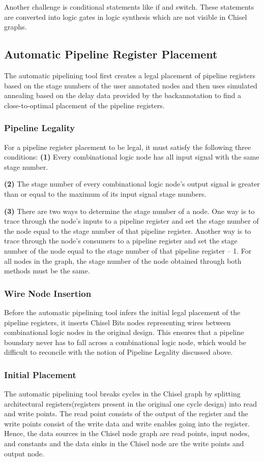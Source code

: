 Another challenge is conditional statements like if and switch. These statements are converted into logic gates in logic synthesis which are not visible in Chisel graphs. 

\subsection{Automatic Pipeline Register Placement}
The automatic pipelining tool first creates a legal placement of pipeline registers based on the stage numbers of the user annotated nodes and then uses simulated annealing based on the delay data provided by the backannotation to find a close-to-optimal placement of the pipeline registers. 

\subsubsection{Pipeline Legality}
For a pipeline register placement to be legal, it must satisfy the following three conditions:
{\bf (1)} Every combinational logic node has all input signal with the same stage number.  

{\bf (2)} The stage number of every combinational logic node's output signal is greater than or equal to the maximum of its input signal stage numbers. 

{\bf (3)} There are two ways to determine the stage number of a node. One way is to trace through the node's inputs to a pipeline register and set the stage number of the node equal to the stage number of that pipeline register. Another way is to trace through the node’s consumers to a pipeline register and set the stage number of the node equal to the stage number of that pipeline register – 1. For all nodes in the graph, the stage number of the node obtained through both methods must be the same.

\subsubsection{Wire Node Insertion}
\label{wiresection}
Before the automatic pipelining tool infers the initial legal placement of the pipeline registers, it inserts Chisel Bits nodes representing wires between combinational logic nodes in the original design. This ensures that a pipeline boundary never has to fall across a combinational logic node, which would be difficult to reconcile with the notion of Pipeline Legality discussed above.
\subsubsection{Initial Placement}
The automatic pipelining tool breaks cycles in the Chisel graph by splitting architectural registers(registers present in the original one cycle design) into read and write points. The read point consists of the output of the register and the write points consist of the write data and write enables going into the register. Hence, the data sources in the Chisel node graph are read points, input nodes, and constants and the data sinks in the Chisel node are the write points and output node.

